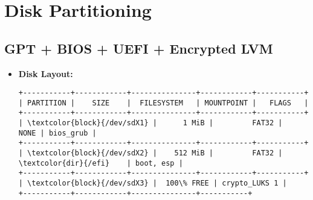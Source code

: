 \documentclass[10pt, a4paper, onecolumn, openany]{book} %
\begin{document}
\section{Disk Partitioning}
\subsection{GPT + BIOS + UEFI + Encrypted LVM}
\begin{itemize}
    \item \textbf{Disk Layout:}
\begin{Verbatim}[commandchars=\\\{\}]
+-----------+------------+---------------+------------+-----------+
| PARTITION |    SIZE    |  FILESYSTEM   | MOUNTPOINT |   FLAGS   |
+-----------+------------+---------------+------------+-----------+
| \textcolor{block}{/dev/sdX1} |      1 MiB |         FAT32 |       NONE | bios_grub |
+-----------+------------+---------------+------------+-----------+
| \textcolor{block}{/dev/sdX2} |    512 MiB |         FAT32 |    \textcolor{dir}{/efi}    | boot, esp |
+-----------+------------+---------------+------------+-----------+
| \textcolor{block}{/dev/sdX3} |  100\% FREE | crypto_LUKS 1 |
+-----------+------------+---------------+-----------+
\end{Verbatim}

\end{itemize}
\end{document}
